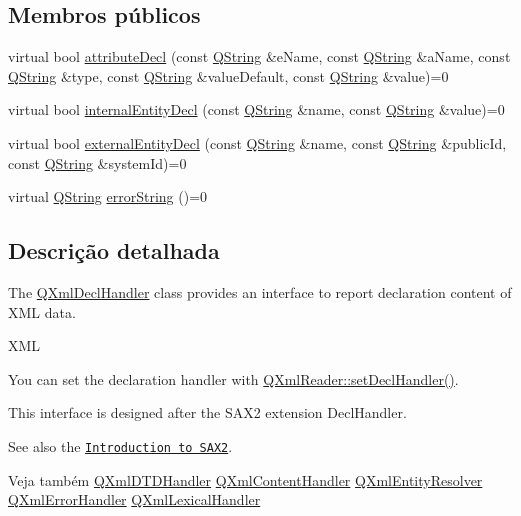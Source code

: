 \subsection*{Membros públicos}
\begin{DoxyCompactItemize}
\item 
virtual bool \hyperlink{class_q_xml_decl_handler_a59637787766b7b5629c20abd1b3bc7fb}{attribute\-Decl} (const \hyperlink{class_q_string}{Q\-String} \&e\-Name, const \hyperlink{class_q_string}{Q\-String} \&a\-Name, const \hyperlink{class_q_string}{Q\-String} \&type, const \hyperlink{class_q_string}{Q\-String} \&value\-Default, const \hyperlink{class_q_string}{Q\-String} \&value)=0
\item 
virtual bool \hyperlink{class_q_xml_decl_handler_a27b7fd1eeda25cdb63b720648bd87ee4}{internal\-Entity\-Decl} (const \hyperlink{class_q_string}{Q\-String} \&name, const \hyperlink{class_q_string}{Q\-String} \&value)=0
\item 
virtual bool \hyperlink{class_q_xml_decl_handler_acdd5b35534471dc8ad76f8f5e1041361}{external\-Entity\-Decl} (const \hyperlink{class_q_string}{Q\-String} \&name, const \hyperlink{class_q_string}{Q\-String} \&public\-Id, const \hyperlink{class_q_string}{Q\-String} \&system\-Id)=0
\item 
virtual \hyperlink{class_q_string}{Q\-String} \hyperlink{class_q_xml_decl_handler_ac86bbbabef3a52aec7615cbbc0adb3f4}{error\-String} ()=0
\end{DoxyCompactItemize}


\subsection{Descrição detalhada}
The \hyperlink{class_q_xml_decl_handler}{Q\-Xml\-Decl\-Handler} class provides an interface to report declaration content of X\-M\-L data. 

X\-M\-L

You can set the declaration handler with \hyperlink{class_q_xml_reader_a00252501a616d2e14f5d51acc2cb1165}{Q\-Xml\-Reader\-::set\-Decl\-Handler()}.

This interface is designed after the S\-A\-X2 extension Decl\-Handler.

See also the \href{xml.html#introSAX2}{\tt Introduction to S\-A\-X2}.

\begin{DoxySeeAlso}{Veja também}
\hyperlink{class_q_xml_d_t_d_handler}{Q\-Xml\-D\-T\-D\-Handler} \hyperlink{class_q_xml_content_handler}{Q\-Xml\-Content\-Handler} \hyperlink{class_q_xml_entity_resolver}{Q\-Xml\-Entity\-Resolver} \hyperlink{class_q_xml_error_handler}{Q\-Xml\-Error\-Handler} \hyperlink{class_q_xml_lexical_handler}{Q\-Xml\-Lexical\-Handler} 
\end{DoxySeeAlso}


